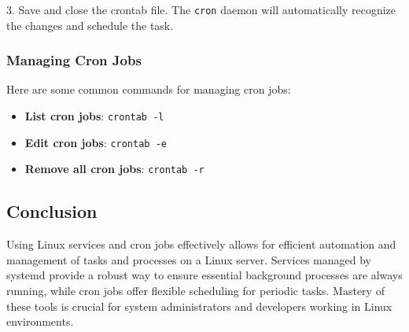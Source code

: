 3. Save and close the crontab file. The \texttt{cron} daemon will automatically recognize the changes and schedule the task.

\subsubsection{Managing Cron Jobs}
Here are some common commands for managing cron jobs:

\begin{itemize}
    \item \textbf{List cron jobs}: \texttt{crontab -l}
    \item \textbf{Edit cron jobs}: \texttt{crontab -e}
    \item \textbf{Remove all cron jobs}: \texttt{crontab -r}
\end{itemize}

\subsection{Conclusion}
Using Linux services and cron jobs effectively allows for efficient automation and management of tasks and processes on a Linux server. Services managed by systemd provide a robust way to ensure essential background processes are always running, while cron jobs offer flexible scheduling for periodic tasks. Mastery of these tools is crucial for system administrators and developers working in Linux environments.
